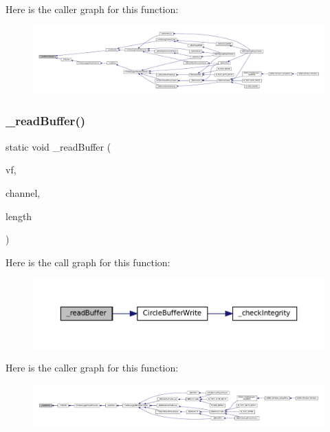 Here is the caller graph for this function\+:
\nopagebreak
\begin{figure}[H]
\begin{center}
\leavevmode
\includegraphics[width=350pt]{video-logger_8c_abb929a40c45d70202af57598a73f625a_icgraph}
\end{center}
\end{figure}
\mbox{\label{video-logger_8c_a4b7dfbbd89bf3e590e5c16912b79bfa4}} 
\subsubsection{\texorpdfstring{\+\_\+read\+Buffer()}{\_readBuffer()}}
{\footnotesize\ttfamily static void \+\_\+read\+Buffer (\begin{DoxyParamCaption}\item[{struct V\+File $\ast$}]{vf,  }\item[{struct m\+Video\+Log\+Channel $\ast$}]{channel,  }\item[{size\+\_\+t}]{length }\end{DoxyParamCaption})\hspace{0.3cm}{\ttfamily [static]}}

Here is the call graph for this function\+:
\nopagebreak
\begin{figure}[H]
\begin{center}
\leavevmode
\includegraphics[width=350pt]{video-logger_8c_a4b7dfbbd89bf3e590e5c16912b79bfa4_cgraph}
\end{center}
\end{figure}
Here is the caller graph for this function\+:
\nopagebreak
\begin{figure}[H]
\begin{center}
\leavevmode
\includegraphics[width=350pt]{video-logger_8c_a4b7dfbbd89bf3e590e5c16912b79bfa4_icgraph}
\end{center}
\end{figure}
\mbox{\label{video-logger_8c_abcbab73349348e3342c1e7255ed55ee4}} 

